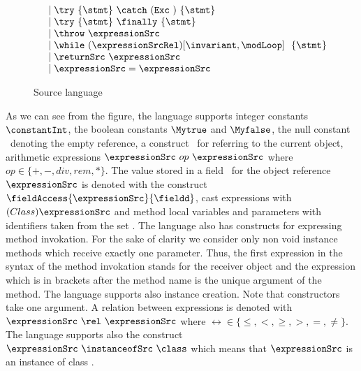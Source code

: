 \begin{figure}[ht!]
\begin{frameit}
$$\begin{array} {ll}
			        & \mid \try  \ \{ \stmt \}  \ \catch \ ( \mbox{\rm\texttt{Exc} } )\ \{ \stmt \} \\
		                & \mid \try  \ \{ \stmt \} \ \finally \ \{ \stmt \} \\
				& \mid \throw \ \expressionSrc  \\
                                & \mid \while \ (\expressionSrcRel) \lbrack \invariant, \modLoop \rbrack \ \do \ \{ \stmt \}\ \\
				& \mid \returnSrc \  \expressionSrc \\
                   		& \mid \expressionSrc = \expressionSrc \\        
    \end{array} $$
\caption{\sc Source language}
\label{source:grammar}
\end{frameit}
\end{figure}


    As we can see from the figure, the language supports 
    integer constants $\constantInt$, the boolean constants  $ \Mytrue$ and $\Myfalse$, the null constant \Mynull \ 
    denoting  the empty reference, a construct \this \ for referring to the current object,  
    arithmetic expressions  $\expressionSrc \ op \ \expressionSrc$ where $op \in  \{+ , - , div , rem, * \}$.
    The value stored in a field \fieldd \ for the object reference $\expressionSrc $ is denoted with
    the construct  $ \fieldAccess{\expressionSrc}{\fieldd} $, cast expressions with   $(Class) \expressionSrc$
    and method local variables  and parameters with identifiers taken from the set \var.  
    The language also has constructs for expressing method invokation.  For the sake of clarity we consider only non void  instance  methods which receive exactly one parameter. 
    Thus, the first expression in the syntax of the method invokation stands for the receiver object and 
    the expression which is in brackets after the  method name is the unique argument of the  method.
    The language supports also instance creation. Note that constructors take one argument.
    A relation between    expressions is denoted with
     $\expressionSrc \ \rel \ \expressionSrc $ where $\rel  \in \{ \le, < ,  \ge, >, = , \neq \}$. 
     The language supports also the construct  $\expressionSrc \ \instanceofSrc \ \class$ which means that
     $\expressionSrc$ is an instance of class \class.
    
